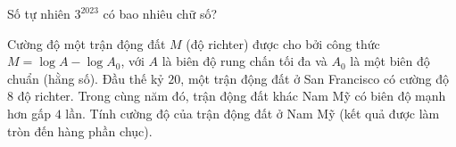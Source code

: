 \begin{ex}%
	Số tự nhiên $3^{2023}$ có bao nhiêu chữ số?
\end{ex}
\begin{ex}%
	Cường độ một trận động đất $M$ (độ richter) được cho bởi công thức $M= \log A-\log A_0$, với $A$ là biên độ rung chấn tối đa và $A_0$ là một biên độ chuẩn (hằng số). Đầu thế kỷ $20$, một trận động đất ở San Francisco có cường độ $8$ độ richter. Trong cùng năm đó, trận động đất khác Nam Mỹ có biên độ mạnh hơn gấp $4$ lần. Tính cường độ của trận động đất ở Nam Mỹ (kết quả được làm tròn đến hàng phần chục). 
\end{ex}
